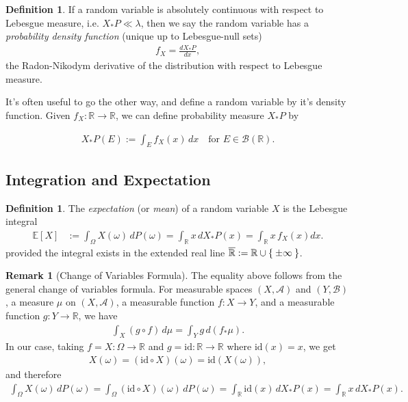 \documentclass[11pt,reqno]{amsart}
\theoremstyle{definition}
\newtheorem{definition}[theorem]{Definition}
\newtheorem{remark}[theorem]{Remark}
\theoremstyle{remark}
\begin{document}
\begin{definition}
	If a random variable is absolutely continuous with respect to Lebesgue measure, i.e. \(X_{*}P \ll \lambda\), then we say the random variable has a \emph{probability density function} (unique up to Lebesgue-null sets)
	\begin{align*}
		f_X = \frac{d X_{*}P}{dx},
	\end{align*}
	the Radon-Nikodym derivative of the distribution with respect to Lebesgue measure.
\end{definition}

It's often useful to go the other way, and define a random variable by it's density function. Given \(f_X: \mathbb{R} \rightarrow \mathbb{R}\), we can define probability measure \(X_{*}P\) by

\begin{align*}
	X_{*}P (E) := \int_E f_X(x) \, dx \quad \text{for } E \in \mathcal{B}(\mathbb{R}).
\end{align*}

\subsection{Integration and Expectation}

\begin{definition}
	The \emph{expectation} (or \emph{mean}) of a random variable $X$ is the Lebesgue integral
	\begin{align}
		\mathbb{E}[X]
		 & := \int_\Omega X(\omega) \, dP(\omega)
		= \int_{\mathbb{R}} x \, dX_*P(x)
		= \int_{\mathbb{R}} x \, f_X(x) dx.
	\end{align}
	provided the integral exists in the extended real line $\overline{\mathbb{R}} := \mathbb{R} \cup \Set{\pm \infty}$.
\end{definition}

\begin{remark}[Change of Variables Formula]
	The equality above follows from the general change of variables formula. For measurable spaces $(X, \mathcal{A})$ and $(Y, \mathcal{B})$, a measure $\mu$ on $(X, \mathcal{A})$, a measurable function $f: X \to Y$, and a measurable function $g: Y \to \mathbb{R}$, we have
	\begin{align*}
		\int_X (g \circ f) \, d\mu = \int_Y g \, d(f_*\mu).
	\end{align*}
	In our case, taking $f = X: \Omega \to \mathbb{R}$ and $g = \text{id}: \mathbb{R} \to \mathbb{R}$ where $\text{id}(x) = x$, we get
	\begin{align*}
		X(\omega) = (\text{id} \circ X)(\omega) = \text{id}(X(\omega)),
	\end{align*}
	and therefore
	\begin{align*}
		\int_\Omega X(\omega) \, dP(\omega) = \int_\Omega (\text{id} \circ X)(\omega) \, dP(\omega) = \int_{\mathbb{R}} \text{id}(x) \, dX_*P(x) = \int_{\mathbb{R}} x \, dX_*P(x).
	\end{align*}
\end{remark}
\end{document}
